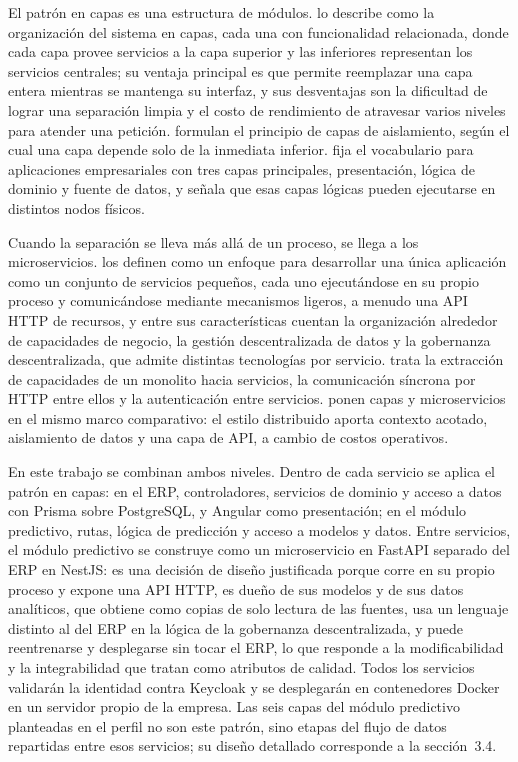 El patrón en capas es una estructura de módulos. \textcite{Sommerville2016} lo describe como la organización del sistema en capas, cada una con funcionalidad relacionada, donde cada capa provee servicios a la capa superior y las inferiores representan los servicios centrales; su ventaja principal es que permite reemplazar una capa entera mientras se mantenga su interfaz, y sus desventajas son la dificultad de lograr una separación limpia y el costo de rendimiento de atravesar varios niveles para atender una petición. \textcite{Richards2020} formulan el principio de capas de aislamiento, según el cual una capa depende solo de la inmediata inferior. \textcite{Fowler2002} fija el vocabulario para aplicaciones empresariales con tres capas principales, presentación, lógica de dominio y fuente de datos, y señala que esas capas lógicas pueden ejecutarse en distintos nodos físicos.

Cuando la separación se lleva más allá de un proceso, se llega a los microservicios. \textcite{Lewis2014} los definen como un enfoque para desarrollar una única aplicación como un conjunto de servicios pequeños, cada uno ejecutándose en su propio proceso y comunicándose mediante mecanismos ligeros, a menudo una API HTTP de recursos, y entre sus características cuentan la organización alrededor de capacidades de negocio, la gestión descentralizada de datos y la gobernanza descentralizada, que admite distintas tecnologías por servicio. \textcite{Newman2021} trata la extracción de capacidades de un monolito hacia servicios, la comunicación síncrona por HTTP entre ellos y la autenticación entre servicios. \textcite{Richards2020} ponen capas y microservicios en el mismo marco comparativo: el estilo distribuido aporta contexto acotado, aislamiento de datos y una capa de API, a cambio de costos operativos.

En este trabajo se combinan ambos niveles. Dentro de cada servicio se aplica el patrón en capas: en el ERP, controladores, servicios de dominio y acceso a datos con Prisma sobre PostgreSQL, y Angular como presentación; en el módulo predictivo, rutas, lógica de predicción y acceso a modelos y datos. Entre servicios, el módulo predictivo se construye como un microservicio en FastAPI separado del ERP en NestJS: es una decisión de diseño justificada porque corre en su propio proceso y expone una API HTTP, es dueño de sus modelos y de sus datos analíticos, que obtiene como copias de solo lectura de las fuentes, usa un lenguaje distinto al del ERP en la lógica de la gobernanza descentralizada, y puede reentrenarse y desplegarse sin tocar el ERP, lo que responde a la modificabilidad y la integrabilidad que \textcite{Bass2021} tratan como atributos de calidad. Todos los servicios validarán la identidad contra Keycloak y se desplegarán en contenedores Docker en un servidor propio de la empresa. Las seis capas del módulo predictivo planteadas en el perfil no son este patrón, sino etapas del flujo de datos repartidas entre esos servicios; su diseño detallado corresponde a la sección~3.4.
